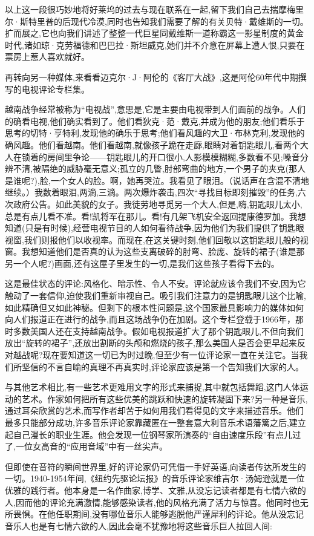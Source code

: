以上这一段很巧妙地将好莱坞的过去与现在联系在一起,留下我们自己去揣摩梅里尔·斯特里普的后现代冷漠,同时也告知我们需要了解的有关贝特·戴维斯的一切。扩而展之,它也向我们讲述了整整一代巨星同戴维斯一道称霸这一影星制度的黄金时代,诸如琼·克劳福德和巴巴拉·斯坦威克,她们并不介意在屏幕上遭人恨,只要在票房上惹人喜欢就好。

再转向另一种媒体,来看看迈克尔·J·阿伦的《客厅大战》,这是阿伦60年代中期撰写的电视评论专栏集。

越南战争经常被称为“电视战”,意思是,它是主要由电视带到人们面前的战争。人们的确看电视,他们确实看到了。他们看狄克·范·戴克,并成为他的朋友;他们看乐于思考的切特·亨特利,发现他的确乐于思考;他们看风趣的大卫·布林克利,发现他的确风趣。他们看越南。他们看越南,就像孩子跪在走廊,眼睛对着钥匙眼儿,看两个大人在锁着的房间里争论——钥匙眼儿的开口很小,人影模模糊糊,多数看不见;嗓音分辨不清,被隔绝的威胁毫无意义;孤立的几瞥,肘部弯曲的地方,一个男子的夹克(那人是谁呢?),脸,一个女人的脸。啊，她再哭泣。我看见了眼泪。（说话声在含混不清地继续。）我数着眼泪,两滴,三滴。两次爆炸袭击,四次“寻找目标即刻摧毁”的任务,六次政府公告。如此美貌的女子。我徒劳地寻觅另一个大人,但是,嗨,钥匙眼儿太小,总是有点儿看不准。看!凯将军在那儿。看!有几架飞机安全返回提康德罗加。我想知道(只是有时候),经营电视节目的人如何看待战争,因为他们为我们提供了钥匙眼视窗,我们则报他们以收视率。而现在,在这关键时刻,他们回敬以这钥匙眼儿般的视窗。我想知道他们是否真的认为这些支离破碎的肘弯、脸庞、旋转的裙子(谁是那另一个人呢?)画面,还有这屋子里发生的一切,是我们这些孩子看得下去的。

这是最佳状态的评论:风格化、暗示性、令人不安。评论就应该令我们不安,因为它触动了一套信仰,迫使我们重新审视自己。吸引我们注意力的是钥匙眼儿这个比喻,如此精确但又如此神秘。但剩下的根本性问题是,这个国家最具影响力的媒体如何向人们报道正在进行的战争,而且这场战争仍在加剧。这个专栏登载于1966年，那时多数美国人还在支持越南战争。假如电视报道扩大了那个钥匙眼儿,不但向我们放出“旋转的裙子”,还放出割断的头颅和燃烧的孩子,那么美国人是否会更早起来反对越战呢?现在要知道这一切已为时过晚,但至少有一位评论家一直在关注它。当我们所坚信的不言自喻的真理不再真实时,评论家应该是第一个告知我们大家的人。

与其他艺术相比,有一些艺术更难用文字的形式来捕捉,其中就包括舞蹈,这门人体运动的艺术。作家如何把所有这些优美的跳跃和快速的旋转凝固下来?另一种是音乐,通过耳朵欣赏的艺术,而写作者却苦于如何用我们看得见的文字来描述音乐。他们最多只能部分成功,许多音乐评论家靠藏匿在一整套意大利音乐术语藩篱之后,建立起自己漫长的职业生涯。他会发现一位钢琴家所演奏的“自由速度乐段”有点儿过了,一位女高音的“应用音域”中有一丝尖声。

但即使在音符的瞬间世界里,好的评论家仍可凭借一手好英语,向读者传达所发生的一切。1940-1954年间,《纽约先驱论坛报》的音乐评论家维吉尔·汤姆逊就是一位优雅的践行者。他本身是一名作曲家,博学、文雅,从没忘记读者都是有七情六欲的人,因而他的评论充满激情,能够感染读者,他的风格充满了活力与惊喜。他同时也无所畏惧。在他任职期间,没有哪位音乐人能够逃脱他严谨犀利的评论。他从没忘记音乐人也是有七情六欲的人,因此会毫不犹豫地将这些音乐巨人拉回人间:


